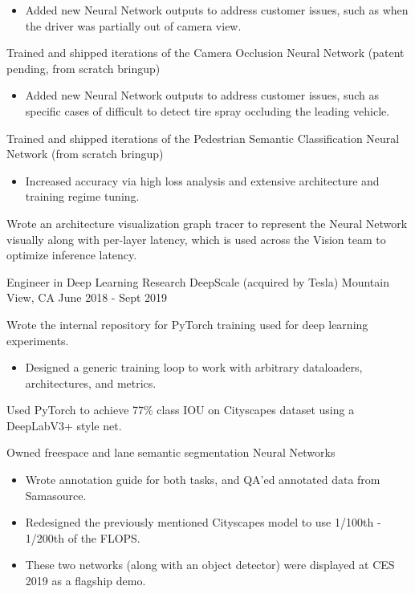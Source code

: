 \begin{cventries}
{\begin{cvitems}
\begin{itemize}
        \item Added new Neural Network outputs to address customer issues, such as when the driver was partially
              out of camera view.
      \end{itemize}
      \item Trained and shipped iterations of the Camera Occlusion Neural Network (patent pending, from scratch bringup)
      \begin{itemize}
        \item Added new Neural Network outputs to address customer issues, such as specific cases of difficult to
              detect tire spray occluding the leading vehicle.
      \end{itemize}
      \item Trained and shipped iterations of the Pedestrian Semantic Classification Neural Network (from scratch bringup)
      \begin{itemize}
        \item Increased accuracy via high loss analysis and extensive architecture and training regime tuning.
      \end{itemize}
      \item Wrote an architecture visualization graph tracer to represent the Neural Network visually along
      with per-layer latency, which is used across the Vision team to optimize inference latency.
    \end{cvitems}
  }

  \cventry
  {Engineer in Deep Learning Research}
  {DeepScale (acquired by Tesla)}
  {Mountain View, CA}
  {June 2018 - Sept 2019}
  {
    \begin{cvitems}
      \item Wrote the internal repository for PyTorch training used for deep learning experiments.
      \begin{itemize}
        \item Designed a generic training loop to work with arbitrary dataloaders, architectures, and metrics.
      \end{itemize}
      \item Used PyTorch to achieve 77\% class IOU on Cityscapes dataset using a DeepLabV3+ style net.
      \item Owned freespace and lane semantic segmentation Neural Networks
      \begin{itemize}
        \item Wrote annotation guide for both tasks, and QA'ed annotated data from Samasource.
        \item Redesigned the previously mentioned Cityscapes model to use 1/100th - 1/200th of the FLOPS.
        \item These two networks (along with an object detector) were displayed at CES 2019 as a flagship demo.
      \end{itemize}
    \end{cvitems}
  }

\end{cventries}
